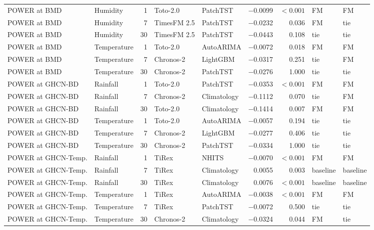 \begin{table}[htbp]
\begin{tabular}{llrllrrll}
    POWER at BMD & Humidity & 1 & Toto-2.0 & PatchTST & \num{-0.0099} & $<\num{0.001}$ & FM & FM \\
    POWER at BMD & Humidity & 7 & TimesFM 2.5 & PatchTST & \num{-0.0232} & \num{0.036} & FM & tie \\
    POWER at BMD & Humidity & 30 & TimesFM 2.5 & PatchTST & \num{-0.0443} & \num{0.108} & tie & tie \\
    POWER at BMD & Temperature & 1 & Toto-2.0 & AutoARIMA & \num{-0.0072} & \num{0.018} & FM & FM \\
    POWER at BMD & Temperature & 7 & Chronos-2 & LightGBM & \num{-0.0317} & \num{0.251} & tie & FM \\
    POWER at BMD & Temperature & 30 & Chronos-2 & PatchTST & \num{-0.0276} & \num{1.000} & tie & tie \\
    POWER at GHCN-BD & Rainfall & 1 & Toto-2.0 & PatchTST & \num{-0.0353} & $<\num{0.001}$ & FM & FM \\
    POWER at GHCN-BD & Rainfall & 7 & Chronos-2 & Climatology & \num{-0.1112} & \num{0.070} & tie & FM \\
    POWER at GHCN-BD & Rainfall & 30 & Toto-2.0 & Climatology & \num{-0.1414} & \num{0.007} & FM & FM \\
    POWER at GHCN-BD & Temperature & 1 & Toto-2.0 & AutoARIMA & \num{-0.0057} & \num{0.194} & tie & tie \\
    POWER at GHCN-BD & Temperature & 7 & Chronos-2 & LightGBM & \num{-0.0277} & \num{0.406} & tie & tie \\
    POWER at GHCN-BD & Temperature & 30 & Chronos-2 & PatchTST & \num{-0.0334} & \num{1.000} & tie & tie \\
    POWER at GHCN-Temp. & Rainfall & 1 & TiRex & NHITS & \num{-0.0070} & $<\num{0.001}$ & FM & FM \\
    POWER at GHCN-Temp. & Rainfall & 7 & TiRex & Climatology & \num{+0.0055} & \num{0.003} & baseline & baseline \\
    POWER at GHCN-Temp. & Rainfall & 30 & TiRex & Climatology & \num{+0.0076} & $<\num{0.001}$ & baseline & baseline \\
    POWER at GHCN-Temp. & Temperature & 1 & TiRex & AutoARIMA & \num{-0.0038} & $<\num{0.001}$ & FM & FM \\
    POWER at GHCN-Temp. & Temperature & 7 & TiRex & PatchTST & \num{-0.0072} & \num{0.500} & tie & tie \\
    POWER at GHCN-Temp. & Temperature & 30 & Chronos-2 & Climatology & \num{-0.0324} & \num{0.044} & FM & tie \\
    \bottomrule
  \end{tabular}
\end{table}
